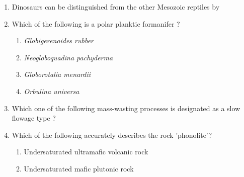 \documentclass[12pt,fleqn]{article}
\theoremstyle{remark}
\begin{document}
\begin{enumerate}[label=Q.\arabic*.]
\begin {enumerate}
            \end{enumerate}
    \item Dinosaurs can be distinguished from the other Mesozoic reptiles by \hfill{} 
        \begin {enumerate}
            \end{enumerate}
    \item Which of the following is a polar planktic formanifer ? \hfill{} 
            \begin{enumerate}
                \item \textit{Globigerenoides rubber}
                \item \textit{Neogloboquadina pachyderma}
                \item \textit{Globorotalia menardii}
                \item \textit{Orbulina universa}                
            \end{enumerate}
    \item Which one of the following mass-wasting processes is designated as a slow flowage type ? \hfill{} 
    \begin {enumerate}
            \end{enumerate}
    \item Which of the following accurately describes the rock 'phonolite'? \hfill{} 
    \begin{enumerate}
                \item Undersaturated ultramafic volcanic rock
                \item Undersaturated mafic plutonic rock

\end{enumerate}
\end{enumerate}
\end{document}
